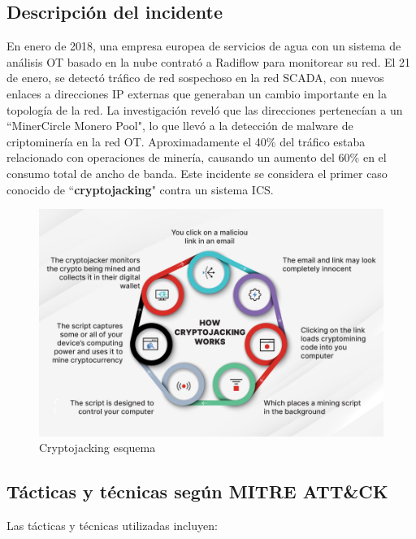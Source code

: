 \subsection{Descripción del incidente}
En enero de 2018, una empresa europea de servicios de agua con un sistema de análisis OT basado en la nube contrató a Radiflow para monitorear su red. El 21 de enero, se detectó tráfico de red sospechoso en la red SCADA, con nuevos enlaces a direcciones IP externas que generaban un cambio importante en la topología de la red. La investigación reveló que las direcciones pertenecían a un ``MinerCircle Monero Pool", lo que llevó a la detección de malware de criptominería en la red OT. Aproximadamente el 40\% del tráfico estaba relacionado con operaciones de minería, causando un aumento del 60\% en el consumo total de ancho de banda. Este incidente se considera el primer caso conocido de ``\textbf{cryptojacking}" contra un sistema ICS.

\begin{figure}[htbp]
    \centering
    \includegraphics[width=0.85\columnwidth]{images/cryptojacking.jpg}
    \caption{Cryptojacking esquema}
    \label{fig:cryptojacking}
\end{figure}

\subsection{Tácticas y técnicas según MITRE ATT\&CK}
Las tácticas y técnicas utilizadas incluyen:

